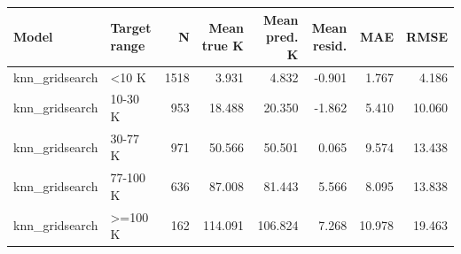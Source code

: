 \begin{tabular}{llrrrrrr}
\toprule
Model & Target range & N & Mean true K & Mean pred. K & Mean resid. & MAE & RMSE \\
\midrule
knn\_gridsearch & <10 K & 1518 & 3.931 & 4.832 & -0.901 & 1.767 & 4.186 \\
knn\_gridsearch & 10-30 K & 953 & 18.488 & 20.350 & -1.862 & 5.410 & 10.060 \\
knn\_gridsearch & 30-77 K & 971 & 50.566 & 50.501 & 0.065 & 9.574 & 13.438 \\
knn\_gridsearch & 77-100 K & 636 & 87.008 & 81.443 & 5.566 & 8.095 & 13.838 \\
knn\_gridsearch & >=100 K & 162 & 114.091 & 106.824 & 7.268 & 10.978 & 19.463 \\
\bottomrule
\end{tabular}
